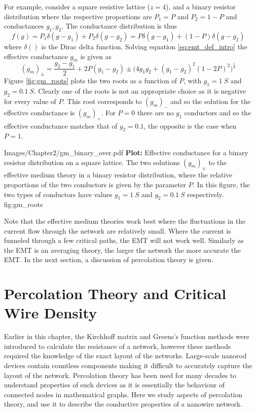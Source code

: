 For example, consider a square resistive lattice ($z = 4$), and a binary resistor distribution where the respective proportions are $P_1 = P$ and $P_2 = 1- P$ and conductances $g_1,g_2$. The conductance distribution is thus 
\begin{equation}
f(g) = P_1 \delta(g-g_1) + P_2 \delta(g - g_2) = P \delta(g-g_1) + (1 - P) \delta(g - g_2)
\end{equation}
where $\delta()$ is the Dirac delta function. Solving equation \ref{eq:emt_def_intro} the effective conductance $g_m$ is given as
\begin{equation}
(g_m)_{\pm} = \frac{g_2 - g_1}{2} + 2 P( g_1  - g_2) \pm \Big( 4 g_1 g_2 + (g_1 - g_2 )^2 (1 - 2 P)^2 \Big)^{\frac{1}{2}} 
\end{equation}
Figure \ref{fig:gm_roots} plots the two roots as a function of $P$, with $g_1 = 1 ~ S$ and $g_2 = 0.1 ~ S$. Clearly one of the roots is not an appropriate choice as it is negative for every value of $P$. This root corresponds to $(g_m)_{-}$ and so the solution for the effective conductance is $(g_m)_{+}$. For $P = 0$ there are no $g_1$ conductors and so the effective conductance matches that of $g_2 = 0.1$, the opposite is the case when $P = 1$. 

{Images/Chapter2/gm_binary_over.pdf}
{\textbf{Plot:} Effective conductance for a binary resistor distribution on a square lattice.}
{The two solutions $(g_m)_{\pm}$ to the effective medium theory in a binary resistor distribution, where the relative proportions of the two conductors is given by the parameter $P$. In this figure, the two types of conductors have values $g_1 = 1 ~ S$ and $g_2 = 0.1 ~ S$ respectively.}
{fig:gm_roots}

Note that the effective medium theories work best where the fluctuations in the current flow through the network are relatively small. Where the current is funneled through a few critical paths, the EMT will not work well. Similarly as the EMT is an averaging theory, the larger the network the more accurate the EMT. In the next section, a discussion of percolation theory is given.
\section{Percolation Theory and Critical Wire Density}
\label{sec: Critical Density}
Earlier in this chapter, the Kirchhoff matrix and Greens's function methods were introduced to calculate the resistance of a network, however these methods required the knowledge of the exact layout of the networks. Large-scale nanorod devices contain countless components making it difficult to accurately capture the layout of the network. Percolation theory\cite{broadbent1957} has been used for many decades to understand properties of such devices as it is essentially the behaviour of connected nodes in mathematical graphs\cite{pike1974,li2009,hecht2006,balberg1983}. Here we study aspects of percolation theory\cite{broadbent1957}, and use it to describe the conductive properties of a nanowire network.

